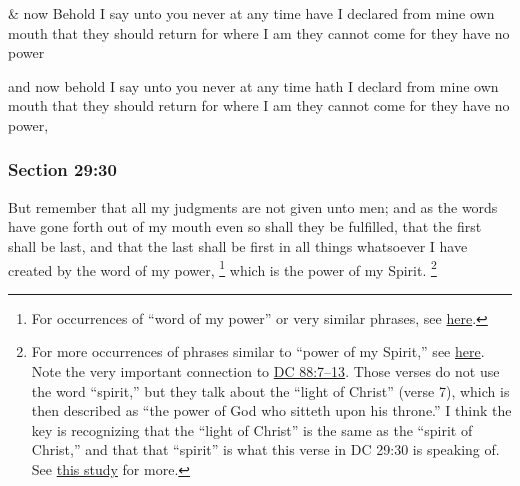 		\begin{framed}
		\scriptsize
			\begin{compactdesc}
				\item[JSP] \& now Behold I say unto you never at any time have I declared from mine own mouth that they should return for where I am they cannot come for they have no power
				\item[HSN] and now behold I say unto you never at any time hath I declard from mine own mouth that they should return for where I am they cannot come for they have no power,
			\end{compactdesc}
		\end{framed}

	\subsubsection{Section 29:30} %
		\label{DC29-30}

		But remember that all my judgments are not given unto men; and as the words have gone forth out of my mouth even so shall they be fulfilled, that the first shall be last, and that the last shall be first in all things whatsoever I have created by the word of my power,%
		\footnote{%
			For occurrences of ``word of my power'' or very similar phrases, see \hyperref[WORD-PHRASES]{here}.
			} 
		which is the power of my Spirit.%
			\footnote{%
				For more occurrences of phrases similar to ``power of my Spirit,'' see \hyperref[POWER-PHRASES]{here}. Note the very important connection to \hyperref[DC88-7]{DC 88:7--13}. Those verses do not use the word ``spirit,'' but they talk about the ``light of Christ'' (verse 7), which is then described as ``the power of God who sitteth upon his throne.'' I think the key is recognizing that the ``light of Christ'' is the same as the ``spirit of Christ,'' and that that ``spirit'' is what this verse in DC 29:30 is speaking of. See \hyperref[LIGHT-christ]{this study} for more.
				} 

